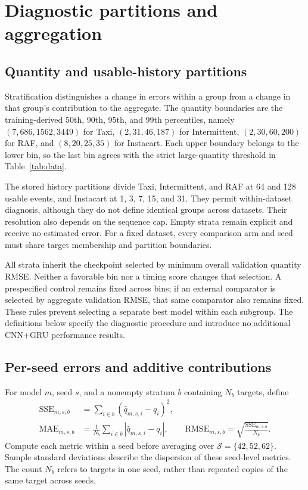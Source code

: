\documentclass[runningheads]{llncs}
\begin{document}
\section{Diagnostic partitions and aggregation}
\label{app:strata}
\subsection{Quantity and usable-history partitions}
Stratification distinguishes a change in errors within a group from a change
in that group's contribution to the aggregate. The quantity boundaries are
the training-derived 50th, 90th, 95th, and 99th percentiles, namely
$(7,686,1562,3449)$ for Taxi, $(2,31,46,187)$ for Intermittent,
$(2,30,60,200)$ for RAF, and $(8,20,25,35)$ for Instacart.
Each upper boundary belongs to the lower bin, so the last bin agrees with
the strict large-quantity threshold in Table~\ref{tab:data}.

The stored history partitions divide Taxi, Intermittent, and RAF at 64 and
128 usable events, and Instacart at 1, 3, 7, 15, and 31. They permit
within-dataset diagnosis, although they do not define identical groups
across datasets. Their resolution also depends on the sequence cap.
Empty strata remain explicit and receive no estimated error. For a fixed
dataset, every comparison arm and seed must share target membership and
partition boundaries.

All strata inherit the checkpoint selected by minimum overall validation
quantity RMSE. Neither a favorable bin nor a timing score changes that
selection. A prespecified control remains fixed across bins; if an external
comparator is selected by aggregate validation RMSE, that same comparator
also remains fixed. These rules prevent selecting a separate best model within
each subgroup. The definitions below specify the diagnostic procedure and
introduce no additional CNN+GRU performance results.

\subsection{Per-seed errors and additive contributions}
For model $m$, seed $s$, and a nonempty stratum $b$ containing $N_b$
targets, define
\begin{align}
 \mathrm{SSE}_{m,s,b}&=\sum_{i\in b}(\widehat q_{m,s,i}-q_i)^2,\\
 \mathrm{MAE}_{m,s,b}&=\frac{1}{N_b}\sum_{i\in b}
       |\widehat q_{m,s,i}-q_i|,\qquad
 \mathrm{RMSE}_{m,s,b}=\sqrt{\frac{\mathrm{SSE}_{m,s,b}}{N_b}}.
 \label{eq:stratum-errors}
\end{align}
Compute each metric within a seed before averaging over
$\mathcal S=\{42,52,62\}$. Sample standard deviations describe the dispersion
of these seed-level metrics. The count $N_b$ refers to targets in one seed,
rather than repeated copies of the same target across seeds.
\end{document}
